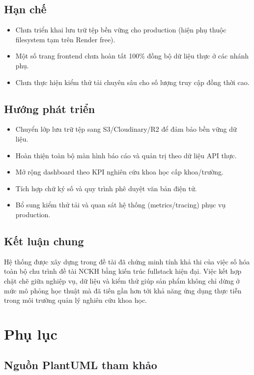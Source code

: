 \documentclass[12pt,a4paper]{report}
\begin{document}
\section{Hạn chế}
\begin{itemize}[leftmargin=1.2cm]
\item Chưa triển khai lưu trữ tệp bền vững cho production (hiện phụ thuộc filesystem tạm trên Render free).
\item Một số trang frontend chưa hoàn tất 100\% đồng bộ dữ liệu thực ở các nhánh phụ.
\item Chưa thực hiện kiểm thử tải chuyên sâu cho số lượng truy cập đồng thời cao.
\end{itemize}

\section{Hướng phát triển}
\begin{itemize}[leftmargin=1.2cm]
\item Chuyển lớp lưu trữ tệp sang S3/Cloudinary/R2 để đảm bảo bền vững dữ liệu.
\item Hoàn thiện toàn bộ màn hình báo cáo và quản trị theo dữ liệu API thực.
\item Mở rộng dashboard theo KPI nghiên cứu khoa học cấp khoa/trường.
\item Tích hợp chữ ký số và quy trình phê duyệt văn bản điện tử.
\item Bổ sung kiểm thử tải và quan sát hệ thống (metrics/tracing) phục vụ production.
\end{itemize}

\section{Kết luận chung}
Hệ thống được xây dựng trong đề tài đã chứng minh tính khả thi của việc số hóa toàn bộ chu trình đề tài NCKH bằng kiến trúc fullstack hiện đại. Việc kết hợp chặt chẽ giữa nghiệp vụ, dữ liệu và kiểm thử giúp sản phẩm không chỉ dừng ở mức mô phỏng học thuật mà đã tiến gần hơn tới khả năng ứng dụng thực tiễn trong môi trường quản lý nghiên cứu khoa học.

\appendix
\chapter{Phụ lục}

\section{Nguồn PlantUML tham khảo}
\end{document}
